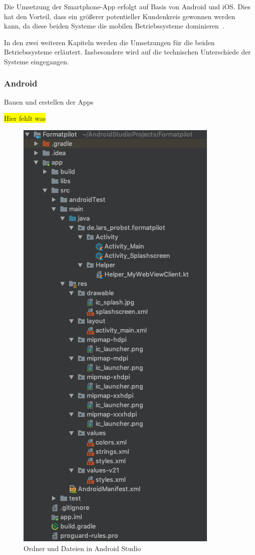 Die Umsetzung der Smartphone-App erfolgt auf Basis von Android und iOS. Dies hat den Vorteil, dass ein größerer
potentieller Kundenkreis gewonnen werden kann, da diese beiden Systeme die mobilen Betriebssysteme
dominieren~\cite{online_umsetzung_mobileos}.

In den zwei weiteren Kapiteln werden die Umsetzungen für die beiden Betriebssysteme erläutert. Insbesondere wird auf die
technischen Unterschiede der Systeme eingegangen.

\subsubsection{Android}
Bauen und erstellen der Apps

\colorbox{yellow}{Hier fehlt was}

\begin{figure}[h]
    \centering
    \includegraphics[scale=0.4]{images/kapitel_4/android_folder.png}
    \caption{Ordner und Dateien in Android Studio}
    \label{fig:umsetzung_android_folder}
\end{figure}

